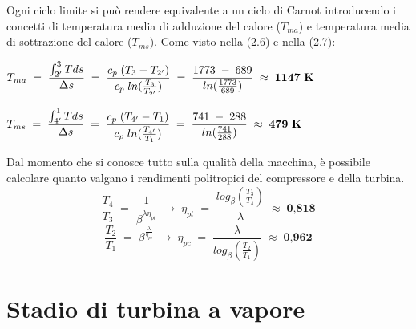 \documentclass[a4paper, twoside, 12pt]{report}
\begin{document}
Ogni ciclo limite si può rendere equivalente a un ciclo di Carnot introducendo i concetti di temperatura media di adduzione del calore ($T_{ma}$) e temperatura media di sottrazione del calore ($T_{ms}$). Come visto nella (2.6) e nella (2.7):
\begin{center}
	$T_{ma}\;=\;\dfrac{\int_{2'}^{3}Tds}{\Delta s}\;=\;\dfrac{c_{p}\;(T_{3}-T_{2'})}{c_{p}\;ln(\frac{T_{3}}{T_{2'}})}\;=\;\dfrac{1773\;-\;689}{ln(\frac{1773}{689})}\;\approx\;\textbf{1147\;K}$
\end{center}
\begin{center}
	$T_{ms}\;=\;\dfrac{\int_{4'}^{1}Tds}{\Delta s}\;=\;\dfrac{c_{p}\;(T_{4'}-T_{1})}{c_{p}\;ln(\frac{T_{4'}}{T_{1}})}\;=\;\dfrac{741\;-\;288}{ln(\frac{741}{288})}\;\approx\;\textbf{479\;K}$
\end{center}
Dal momento che si conosce tutto sulla qualità della macchina, è possibile calcolare quanto valgano i rendimenti politropici del compressore e della turbina.\\
\begin{equation}
	\dfrac{T_{4}}{T_{3}}\;=\;\dfrac{1}{\beta^{\lambda\eta_{pt}}}\;\to\;\eta_{pt}\;=\;\dfrac{log_{\beta}(\frac{T_{3}}{T_{4}})}{\lambda}\;\approx\;\textbf{0,818}
\end{equation}
\begin{equation}
	\dfrac{T_{2}}{T_{1}}\;=\;\beta^{\frac{\lambda}{\eta_{pc}}}\;\to\;\eta_{pc}\;=\;\dfrac{\lambda}{log_{\beta}(\frac{T_{2}}{T_{1}})}\;\approx\;\textbf{0,962}
\end{equation}
\newpage

\chapter{Stadio di turbina a vapore}
\end{document}
